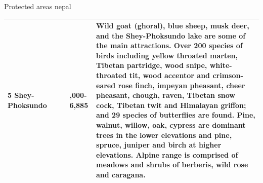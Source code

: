 \documentclass[ignorenonframetext,aspectratio=169]{beamer}
\begin{document}
\begin{frame}{Protected areas nepal}
\begin{table}[t]
\begin{tabular}{>{\raggedright\arraybackslash}p{8em}>{\raggedright\arraybackslash}p{5em}>{\raggedright\arraybackslash}p{5em}>{\raggedright\arraybackslash}p{6em}>{\raggedright\arraybackslash}p{40em}}
\rowcolor{gray!6}  5 Shey-Phoksundo & 1984 & 3555 & 2,000-6,885 & Wild goat (ghoral), blue sheep, musk deer, and the Shey-Phoksundo lake are some of the main attractions. Over 200 species of birds including yellow throated marten, Tibetan partridge, wood snipe, white-throated tit, wood accentor and crimson-eared rose finch, impeyan pheasant, cheer pheasant, chough, raven, Tibetan snow cock, Tibetan twit and Himalayan griffon; and 29 species of butterflies are found. Pine, walnut, willow, oak, cypress are dominant trees in the lower elevations and pine, spruce, juniper and birch at higher elevations. Alpine range is comprised of meadows and shrubs of berberis, wild rose and caragana.\\
\bottomrule
\end{tabular}
\end{table}

\end{frame}
\end{document}
